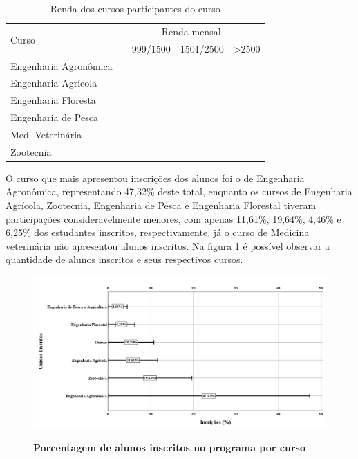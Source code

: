 \begin{table}[]
\centering
\caption{Renda dos cursos participantes do curso}
\label{tabela_7}
\begin{tabular}{lllll}
\hline
\multirow{2}{*}{Curso} & \multicolumn{4}{c}{Renda mensal} \\ \cline{2-5} 
 & \multicolumn{1}{c}{\leq 998} & \multicolumn{1}{c}{999/1500} & \multicolumn{1}{c}{1501/2500} & \multicolumn{1}{c}{\textgreater{}2500} \\ \hline
Engenharia Agronômica &  &  &  &  \\
Engenharia Agrícola &  &  &  &  \\
Engenharia Floresta &  &  &  &  \\
Engenharia de Pesca &  &  &  &  \\
Med. Veterinária &  &  &  &  \\
Zootecnia &  &  &  &  \\ \hline
\end{tabular}
\end{table}






O curso que mais apresentou inscrições dos alunos foi o de Engenharia Agronômica, representando 47,32\% deste total, enquanto os cursos de Engenharia Agrícola, Zootecnia, Engenharia de Pesca e Engenharia Florestal tiveram participações consideravelmente menores, com apenas 11,61\%, 19,64\%, 4,46\% e 6,25\% dos estudantes inscritos, respectivamente, já o curso de Medicina veterinária não apresentou alunos inscritos. Na figura  \ref{figura_10} é possível observar a quantidade de alunos inscritos e seus respectivos cursos.

\begin{figure}[!htb]
\caption{\textbf{Porcentagem de alunos inscritos no programa por curso}}
\centering
\includegraphics[scale=0.3]{Imagens/inscritos.png}
\label{figura_10}
\end{figure}



